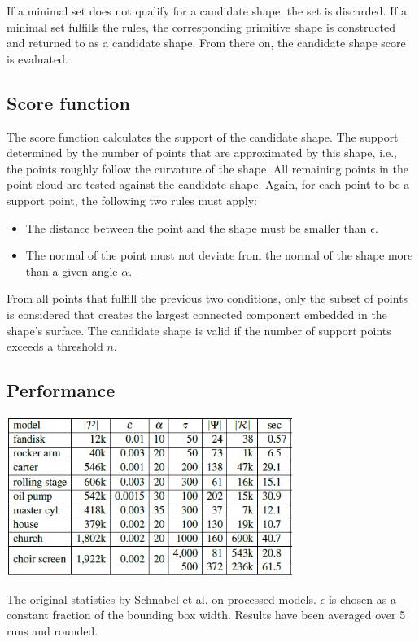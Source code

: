 \begin{itemize}
If a minimal set does not qualify for a candidate shape, the set is discarded. If a minimal set fulfills the rules, the corresponding primitive shape is constructed and returned to as a candidate shape. From there on, the candidate shape score is evaluated. 

\end{itemize} 

\subsection{Score function}
\label{sec:scorefun}

The score function calculates the support of the candidate shape. The support determined by the number of points that are approximated by this shape, i.e., the points roughly follow the curvature of the shape. All remaining points in the point cloud are tested against the candidate shape. Again, for each point to be a support point, the following two rules must apply: 

\begin{itemize}
    \item The distance between the point and the shape must be smaller than $\epsilon$.
    \item The normal of the point must not deviate from the normal of the shape more than a given angle $\alpha$.
\end{itemize}

From all points that fulfill the previous two conditions, only the subset of points is considered that creates the largest connected component embedded in the shape's surface. The candidate shape is valid if the number of support points exceeds a threshold $n$. 


\subsection{Performance}
\label{sec:performance}

\begin{table}
    \centering
    \includegraphics[width=0.7\textwidth]{Shape_Detection/schnabel-performance.png}
    \caption[Original statistics of the shape detection algorithm by Schabel et al.]{The original statistics by Schnabel et al. \cite{schnabel-2007-efficient} on processed models. $\epsilon$ is chosen as a constant fraction of the bounding box width. Results have been averaged over 5 runs and rounded.}
    \label{table:schnabel_performance}
\end{table}


